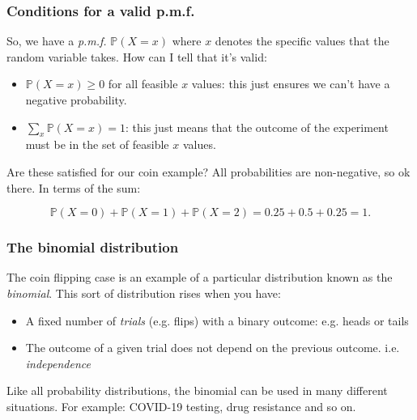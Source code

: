\documentclass{beamer}
\begin{document}
	\begin{frame}
		\frametitle{Conditions for a valid p.m.f.}
		
		So, we have a \textit{p.m.f.} $\mathbb{P}(X=x)$ where $x$ denotes the specific values that the random variable takes. How can I tell that it's valid:
		
		\begin{itemize}
			\item $\mathbb{P}(X=x) \geq 0$ for all feasible $x$ values: this just ensures we can't have a negative probability.
			\item $\sum_{x} \mathbb{P}(X=x) = 1$: this just means that the outcome of the experiment must be in the set of feasible $x$ values.
		\end{itemize}
		
		Are these satisfied for our coin example? All probabilities are non-negative, so ok there. In terms of the sum:
		
		\begin{equation}
		\mathbb{P}(X=0) + \mathbb{P}(X=1) + \mathbb{P}(X=2) = 0.25 + 0.5 + 0.25 = 1.
		\end{equation}
		
	\end{frame}
	
	\begin{frame}
		\frametitle{The binomial distribution}
		The coin flipping case is an example of a particular distribution known as the \textit{binomial}. This sort of distribution rises when you have:
		
		\begin{itemize}
			\item A fixed number of \textit{trials} (e.g. flips) with a binary outcome: e.g. heads or tails
			\item The outcome of a given trial does not depend on the previous outcome. i.e. \textit{independence}
		\end{itemize}
		
		Like all probability distributions, the binomial can be used in many different situations. For example: COVID-19 testing, drug resistance and so on.
		
	\end{frame}
	
\end{document}
